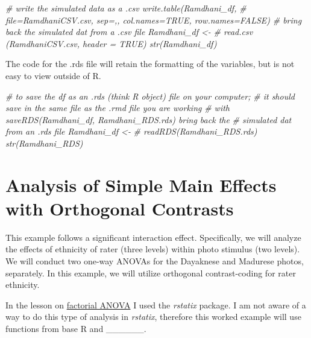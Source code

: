 \documentclass[
  11pt,
]{book}
\newenvironment{Shaded}{\begin{snugshade}}{\end{snugshade}}
\newcommand{\CommentTok}[1]{\textcolor[rgb]{0.37,0.37,0.37}{\textit{#1}}}
\begin{document}
\begin{Shaded}
\begin{Highlighting}[]
\CommentTok{\# write the simulated data as a .csv write.table(Ramdhani\_df,}
\CommentTok{\# file=\textquotesingle{}RamdhaniCSV.csv\textquotesingle{}, sep=\textquotesingle{},\textquotesingle{}, col.names=TRUE, row.names=FALSE)}
\CommentTok{\# bring back the simulated dat from a .csv file Ramdhani\_df \textless{}{-}}
\CommentTok{\# read.csv (\textquotesingle{}RamdhaniCSV.csv\textquotesingle{}, header = TRUE) str(Ramdhani\_df)}
\end{Highlighting}
\end{Shaded}

The code for the .rds file will retain the formatting of the variables, but is not easy to view outside of R.

\begin{Shaded}
\begin{Highlighting}[]
\CommentTok{\# to save the df as an .rds (think \textquotesingle{}R object\textquotesingle{}) file on your computer;}
\CommentTok{\# it should save in the same file as the .rmd file you are working}
\CommentTok{\# with saveRDS(Ramdhani\_df, \textquotesingle{}Ramdhani\_RDS.rds\textquotesingle{}) bring back the}
\CommentTok{\# simulated dat from an .rds file Ramdhani\_df \textless{}{-}}
\CommentTok{\# readRDS(\textquotesingle{}Ramdhani\_RDS.rds\textquotesingle{}) str(Ramdhani\_RDS)}
\end{Highlighting}
\end{Shaded}

\hypertarget{analysis-of-simple-main-effects-with-orthogonal-contrasts}{%
\section*{Analysis of Simple Main Effects with Orthogonal Contrasts}\label{analysis-of-simple-main-effects-with-orthogonal-contrasts}}


This example follows a significant interaction effect. Specifically, we will analyze the effects of ethnicity of rater (three levels) within photo stimulus (two levels). We will conduct two one-way ANOVAs for the Dayaknese and Madurese photos, separately. In this example, we will utilize orthogonal contrast-coding for rater ethnicity.

In the lesson on \protect\hyperlink{between}{factorial ANOVA} I used the \emph{rstatix} package. I am not aware of a way to do this type of analysis in \emph{rstatix}, therefore this worked example will use functions from base R and \_\_\_\_\_\_.
\end{document}
